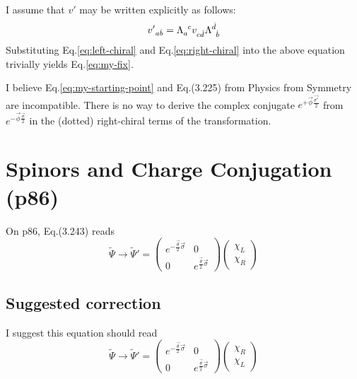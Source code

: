 \documentclass[11pt]{article}
\numberwithin{equation}{section}
\newcommand{\tn}[2]{\tensor{#1}{#2}}
\begin{document}
I assume that $v'$ may be written explicitly as follows:
\begin{equation}
\tn{{v'}}{_a_{\dot{b}}} = \tn{\Lambda}{_a^c} \tn{v}{_c_{\dot{d}}} \tn{\Lambda}{^{\dot{d}}_{\dot{b}}} \label{eq:my-starting-point}
\end{equation}
Substituting Eq.\eqref{eq:left-chiral} and Eq.\eqref{eq:right-chiral} into the above equation trivially yields Eq.\eqref{eq:my-fix}.

I believe Eq.\eqref{eq:my-starting-point} and Eq.(3.225) from Physics from Symmetry are incompatible. There is no way to derive the complex conjugate $e^{+\vec{\phi} \frac{\vec{\sigma^*}}{2}}$ from $e^{- \vec{\phi}\frac{\vec{\sigma}}{2}}$ in the (dotted) right-chiral terms of the transformation.

\section{Spinors and Charge Conjugation (p86)}

On p86, Eq.(3.243) reads
\begin{equation}
\tilde{\Psi} \rightarrow \tilde{\Psi}' = \begin{pmatrix}
e^{-\frac{\vec{\theta}}{2} \vec{\sigma}} & 0 \\
0 & e^{\frac{\vec{\theta}}{2} \vec{\sigma}}
\end{pmatrix} \begin{pmatrix}
\chi_L \\
\chi_R
\end{pmatrix}
\end{equation}

\subsection{Suggested correction}
I suggest this equation should read
\begin{equation}
\tilde{\Psi} \rightarrow \tilde{\Psi}' = \begin{pmatrix}
e^{-\frac{\vec{\theta}}{2} \vec{\sigma}} & 0 \\
0 & e^{\frac{\vec{\theta}}{2} \vec{\sigma}}
\end{pmatrix} \begin{pmatrix}
\chi_R \\
\chi_L
\end{pmatrix}
\end{equation}
\end{document}
